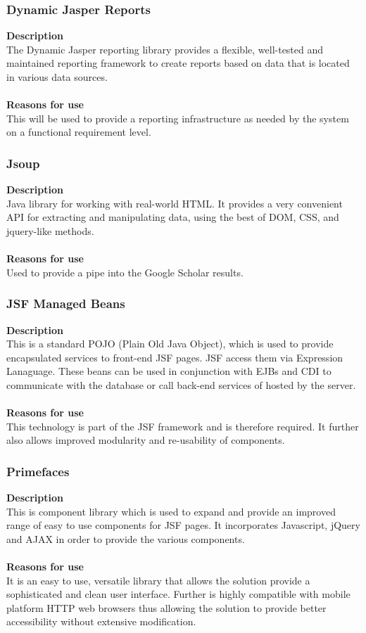 \documentclass[12pt]{article}
\begin{document}
\subsubsection{Dynamic Jasper Reports}
\textbf{Description}\\
The Dynamic Jasper reporting library provides a flexible, well-tested and maintained reporting framework to create reports based on data that is located in various data sources.\\\\
\textbf{Reasons for use}\\
This will be used to provide a reporting infrastructure as needed by the system on a functional requirement level.   

\subsubsection{Jsoup}
\textbf{Description}\\
Java library for working with real-world HTML. It provides a very convenient API for extracting and manipulating data, using the best of DOM, CSS, and jquery-like methods.\\\\
\textbf{Reasons for use}\\
Used to provide a pipe into the Google Scholar results.  

\subsubsection{JSF Managed Beans}
\textbf{Description}\\
This is a standard POJO (Plain Old Java Object), which is used to provide encapsulated services to  front-end JSF pages. JSF access them via Expression Lanaguage. These beans can be used in conjunction with EJBs and CDI to communicate with the database or call back-end services of hosted by the server.\\\\
\textbf{Reasons for use}\\
This technology is part of the JSF framework and is therefore required. It further also allows improved modularity and re-usability of components.

\subsubsection{Primefaces}
\textbf{Description}\\
This is component library which is used to expand and provide an improved range of easy to use components for JSF pages. It incorporates Javascript, jQuery and AJAX in order to provide the various components.\\\\
\textbf{Reasons for use}\\
It is an easy to use, versatile library that allows the solution provide a sophisticated and clean user interface. Further is highly compatible with mobile platform HTTP web browsers thus allowing the solution to provide better accessibility without extensive modification.    
\end{document}
